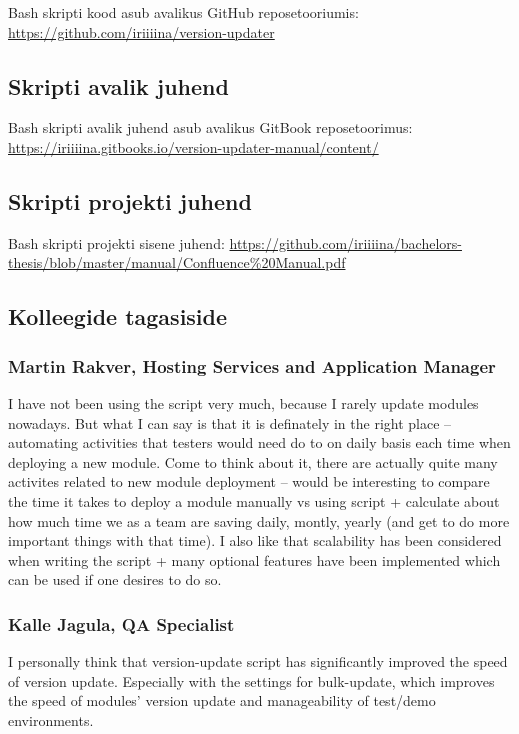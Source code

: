 \documentclass[12pt]{report}
\begin{document}
  Bash skripti kood asub avalikus GitHub reposetooriumis: \url{https://github.com/iriiiina/version-updater}
  
  \subsection{Skripti avalik juhend}
  
  Bash skripti avalik juhend asub avalikus GitBook reposetoorimus: \url{https://iriiiina.gitbooks.io/version-updater-manual/content/}
  
  \subsection{Skripti projekti juhend}
  
  Bash skripti projekti sisene juhend: \url{https://github.com/iriiiina/bachelors-thesis/blob/master/manual/Confluence%20Manual.pdf}
  
  \subsection{Kolleegide tagasiside}
  
  \subsubsection{Martin Rakver, Hosting Services and Application Manager}
  
  I have not been using the script very much, because I rarely update modules nowadays. But what I can say is that it is definately in the right place – automating activities that testers would need do to on daily basis each time when deploying a new module. Come to think about it, there are actually quite many activites related to new module deployment – would be interesting to compare the time it takes to deploy a module manually vs using script + calculate about how much time we as a team are saving daily, montly, yearly (and get to do more important things with that time).
I also like that scalability has been considered when writing the script + many optional features have been implemented which can be used if one desires to do so.

  \subsubsection{Kalle Jagula, QA Specialist}
  
  I personally think that version-update script has significantly improved the speed of version update. Especially with the settings for bulk-update, which improves the speed of modules' version update and manageability of test/demo environments.
  
\end{document}
